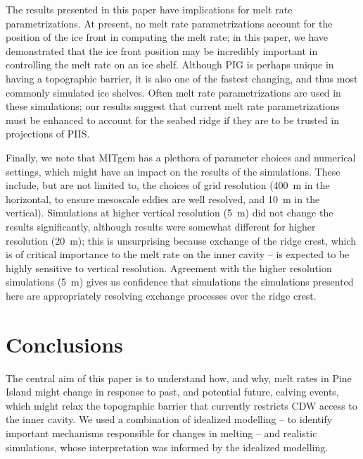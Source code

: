 \documentclass[draft]{agujournal2019}
\begin{document}
The results presented in this paper have implications for melt rate parametrizations. At present, no melt rate parametrizations account for the position of the ice front in computing the melt rate; in this paper, we have demonstrated that the ice front position may be incredibly important in controlling the melt rate on an ice shelf. Although PIG is perhaps unique in having a topographic barrier, it is also one of the fastest changing, and thus most commonly simulated ice shelves. Often melt rate parametrizations are used in these simulations; our results suggest that current melt rate parametrizations must be enhanced to account for the seabed ridge if they are to be trusted in projections of PIIS.

Finally, we note that MITgcm has a plethora of parameter choices and numerical settings, which might have an impact on the results of the simulations. These include, but are not limited to, the choices of grid resolution (400~m in the horizontal, to ensure mesoscale eddies are well resolved, and 10~m in the vertical). Simulations at higher vertical resolution (5~m) did not change the results significantly, although results were somewhat different for higher resolution (20~m); this is unsurprising because exchange of the ridge crest,  which is of critical importance to the melt rate on the inner cavity -- is expected to be highly sensitive to vertical resolution. Agreement with the higher resolution simulations (5~m) gives us confidence that simulations the simulations presented here are appropriately resolving exchange processes over the ridge crest.

\section{Conclusions}
The central aim of this paper is to understand how, and why, melt rates in Pine Island might change in response to past, and potential future, calving events, which might relax the topographic barrier that currently restricts CDW access to the inner cavity. We used a combination of idealized modelling -- to identify important mechanisms responsible for changes in melting -- and realistic simulations, whose interpretation was informed by the idealized modelling.
\end{document}
